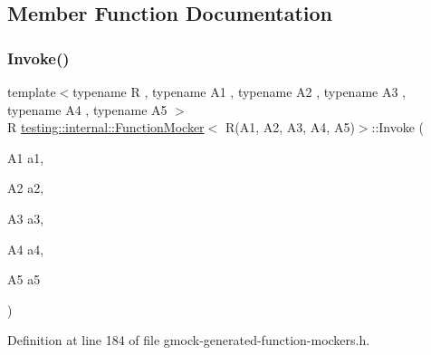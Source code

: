 \subsection{Member Function Documentation}
\mbox{\label{classtesting_1_1internal_1_1FunctionMocker_3_01R_07A1_00_01A2_00_01A3_00_01A4_00_01A5_08_4_a481d6a28daaba552a9d36a9d67e4a3db}} 
\subsubsection{\texorpdfstring{Invoke()}{Invoke()}}
{\footnotesize\ttfamily template$<$typename R , typename A1 , typename A2 , typename A3 , typename A4 , typename A5 $>$ \\
R \hyperlink{classtesting_1_1internal_1_1FunctionMocker}{testing\+::internal\+::\+Function\+Mocker}$<$ R(A1, A2, A3, A4, A5)$>$\+::Invoke (\begin{DoxyParamCaption}\item[{A1}]{a1,  }\item[{A2}]{a2,  }\item[{A3}]{a3,  }\item[{A4}]{a4,  }\item[{A5}]{a5 }\end{DoxyParamCaption})\hspace{0.3cm}{\ttfamily [inline]}}



Definition at line 184 of file gmock-\/generated-\/function-\/mockers.\+h.


